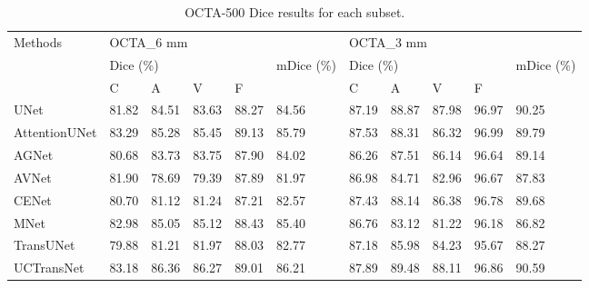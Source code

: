 \documentclass[times, review, 10pt]{elsarticle}
\begin{document}
\begin{CJK}{UTF8}{gbsn}
\begin{table}[htb]
\centering
\caption{OCTA-500 Dice results for each subset.}
\label{tab2}
\renewcommand{\arraystretch}{1} %
\setlength{\tabcolsep}{3.2pt}
\small
\begin{tabular}{lllllllllll} 
\toprule
\multirow{3}{*}{Methods} & \multicolumn{5}{l}{OCTA\_6 mm}                             & \multicolumn{5}{l}{OCTA\_3 mm}                              \\ 
\cline{2-5}\cline{7-10}
                         & \multicolumn{4}{l}{Dice (\%)} & \multirow{2}{*}{mDice (\%)} & \multicolumn{4}{l}{Dice (\%)}  & \multirow{2}{*}{mDice (\%)}  \\ 
\cline{2-5}\cline{7-10}
                         & C     & A     & V     & F     &                            & C     & A     & V     & F     &                             \\ 
\hline
UNet          & 81.82          & 84.51          & 83.63          & 88.27          & 84.56          & 87.19          & 88.87          & 87.98          & 96.97          & 90.25\textbf{} \\
AttentionUNet & 83.29          & 85.28          & 85.45          & 89.13          & 85.79          & 87.53          & 88.31          & 86.32          & 96.99          & 89.79\textbf{} \\
AGNet         & 80.68          & 83.73          & 83.75          & 87.90          & 84.02          & 86.26          & 87.51          & 86.14          & 96.64          & 89.14\textbf{} \\
AVNet         & 81.90          & 78.69          & 79.39          & 87.89          & 81.97          & 86.98          & 84.71          & 82.96          & 96.67          & 87.83\textbf{} \\
CENet         & 80.70          & 81.12          & 81.24          & 87.21          & 82.57          & 87.43          & 88.14          & 86.38          & 96.78          & 89.68\textbf{} \\
MNet          & 82.98          & 85.05          & 85.12          & 88.43          & 85.40          & 86.76          & 83.12          & 81.22          & 96.18          & 86.82\textbf{} \\
TransUNet     & 79.88          & 81.21          & 81.97          & 88.03          & 82.77          & 87.18          & 85.98          & 84.23          & 95.67          & 88.27\textbf{} \\
UCTransNet    & 83.18          & 86.36          & 86.27          & 89.01          & 86.21          & 87.89          & 89.48          & 88.11          & 96.86          & 90.59\textbf{} \\

\end{tabular}
\end{table}
\end{CJK}
\end{document}
